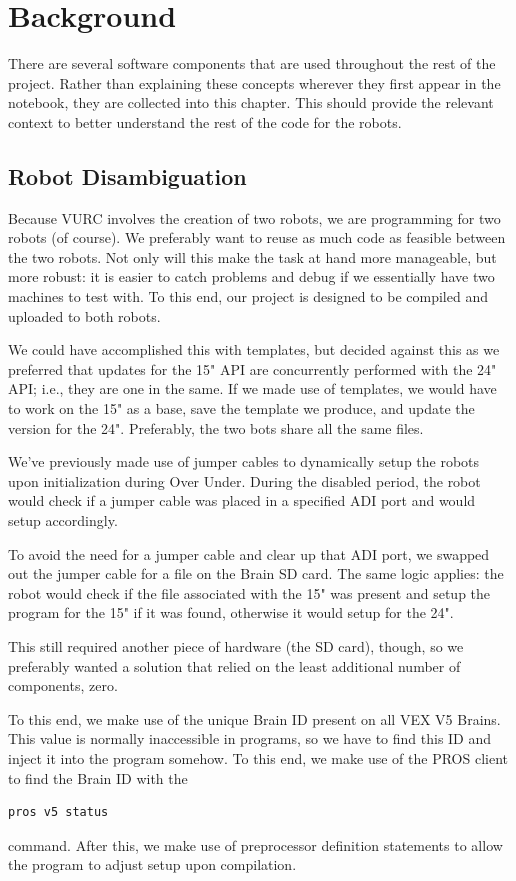 \chapter{Background}
There are several software components that are used throughout the rest of the project. Rather than explaining these concepts wherever they first appear in the notebook, they are collected into this chapter. This should provide the relevant context to better understand the rest of the code for the robots.

\section{Robot Disambiguation}
Because VURC involves the creation of two robots, we are programming for two robots (of course). We preferably want to reuse as much code as feasible between the two robots. Not only will this make the task at hand more manageable, but more robust: it is easier to catch problems and debug if we essentially have two machines to test with. To this end, our project is designed to be compiled and uploaded to both robots. 

We could have accomplished this with templates, but decided against this as we preferred that updates for the 15" API are concurrently performed with the 24" API; i.e., they are one in the same. If we made use of templates, we would have to work on the 15" as a base, save the template we produce, and update the version for the 24". Preferably, the two bots share all the same files. 

We've previously made use of jumper cables to dynamically setup the robots upon initialization during Over Under. During the disabled period, the robot would check if a jumper cable was placed in a specified ADI port and would setup accordingly. 

To avoid the need for a jumper cable and clear up that ADI port, we swapped out the jumper cable for a file on the Brain SD card. The same logic applies: the robot would check if the file associated with the 15" was present and setup the program for the 15" if it was found, otherwise it would setup for the 24". 

This still required another piece of hardware (the SD card), though, so we preferably wanted a solution that relied on the least additional number of components, zero. 

To this end, we make use of the unique Brain ID present on all VEX V5 Brains. This value is normally inaccessible in programs, so we have to find this ID and inject it into the program somehow. To this end, we make use of the PROS client to find the Brain ID with the 
\begin{lstlisting}[language=bash]
pros v5 status
\end{lstlisting}
command. After this, we make use of preprocessor definition statements to allow the program to adjust setup upon compilation. 

